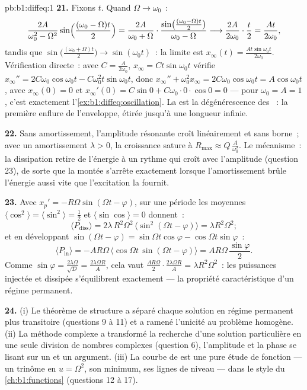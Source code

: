 \begin{solution}{pb:b1:diffeq:1}
\textbf{21.} Fixons $t$. Quand $\Omega \to \omega_0$~:
\[
\frac{2A}{\omega_0^2 - \Omega^2}\sin\Bigl(\frac{(\omega_0 -
\Omega)t}2\Bigr)
= \frac{2A}{\omega_0 + \Omega}\cdot
\frac{\sin\bigl(\frac{(\omega_0 - \Omega)t}2\bigr)}
{\omega_0 - \Omega}
\longrightarrow \frac{2A}{2\omega_0}\cdot\frac t2
= \frac{At}{2\omega_0} ,
\]
tandis que $\sin\bigl(\frac{(\omega_0 + \Omega)t}2\bigr) \to
\sin(\omega_0 t)$~: la limite est $x_\infty(t) =
\frac{At\sin\omega_0 t}{2\omega_0}$. Vérification directe~: avec $C =
\frac A{2\omega_0}$, $x_\infty = Ct\sin\omega_0 t$ vérifie
$x_\infty'' = 2C\omega_0\cos\omega_0 t - C\omega_0^2 t
\sin\omega_0 t$, donc $x_\infty'' + \omega_0^2 x_\infty =
2C\omega_0\cos\omega_0 t = A\cos\omega_0 t$, avec $x_\infty(0) =
0$ et $x_\infty'(0) = C\sin 0 + C\omega_0 \cdot 0 \cdot \cos 0 =
0$ --- pour $\omega_0 = A = 1$, c'est exactement
l'\cref{ex:b1:diffeq:oscillation}. La  est la dégénérescence
des ~: la première enflure de l'enveloppe, étirée jusqu'à
une longueur infinie.

\textbf{22.} Sans amortissement, l'amplitude résonante croît
linéairement et sans borne~; avec un amortissement $\lambda > 0$, la
croissance sature à $R_{\max} \approx Q\,\frac A{\omega_0^2}$. Le
mécanisme~: la dissipation retire de l'énergie à un rythme qui croît
avec l'amplitude (question 23), de sorte que la montée s'arrête
exactement lorsque l'amortissement brûle l'énergie aussi vite que
l'excitation la fournit.

\textbf{23.} Avec $x_p' = -R\Omega\sin(\Omega t - \varphi)$, sur une
période les moyennes $\langle\cos^2\rangle = \langle\sin^2\rangle =
\frac12$ et $\langle\sin\cos\rangle = 0$ donnent~:
\[
\langle P_{\mathrm{diss}}\rangle
= 2\lambda\,R^2\Omega^2\,\langle\sin^2(\Omega t -
\varphi)\rangle = \lambda R^2\Omega^2 ;
\]
et en développant $\sin(\Omega t - \varphi) = \sin\Omega t\cos\varphi
- \cos\Omega t\sin\varphi$~:
\[
\langle P_{\mathrm{in}}\rangle
= -AR\Omega\,\bigl\langle\cos\Omega t\,\sin(\Omega t -
\varphi)\bigr\rangle
= AR\Omega\,\frac{\sin\varphi}2 .
\]
Comme $\sin\varphi = \frac{2\lambda\Omega}{\sqrt D} =
\frac{2\lambda\Omega R}A$, cela vaut $\frac{AR\Omega}2 \cdot
\frac{2\lambda\Omega R}A = \lambda R^2\Omega^2$~: les puissances
injectée et dissipée s'équilibrent exactement --- la propriété
caractéristique d'un régime permanent.

\textbf{24.} (i) Le théorème de structure a séparé chaque solution en
régime permanent plus transitoire (questions 9 à 11) et a ramené
l'unicité au problème homogène. (ii) La méthode complexe a transformé
la recherche d'une solution particulière en une seule division de
nombres complexes (question 6), l'amplitude et la phase se lisant sur
un  et un argument. (iii) La courbe de  est une pure
étude de fonction --- un trinôme en $u = \Omega^2$, son minimum, ses
lignes de niveau --- dans le style du \cref{ch:b1:functions}
(questions 12 à 17).


\end{solution}
